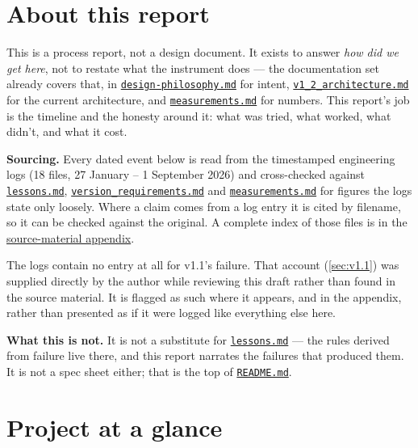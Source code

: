 \documentclass[11pt,a4paper]{article}
\newcommand{\doc}[1]{\href{https://github.com/Lambros25/Function-Generator/blob/main/docs/#1}{\texttt{#1}}}
\newcommand{\docu}[2]{\href{https://github.com/Lambros25/Function-Generator/blob/main/docs/#1}{\texttt{#2}}}
\newcommand{\repofile}[1]{\href{https://github.com/Lambros25/Function-Generator/blob/main/#1}{\texttt{#1}}}
\begin{document}
\section{About this report}
\label{sec:about}

This is a process report, not a design document. It exists to answer \emph{how did we get
    here}, not to restate what the instrument does --- the documentation set already covers
that, in \doc{design-philosophy.md} for intent, \docu{v1_2_architecture.md}{v1\_2\_architecture.md}
for the current architecture, and \doc{measurements.md} for numbers. This report's job is
the timeline and the honesty around it: what was tried, what worked, what didn't, and
what it cost.

\textbf{Sourcing.} Every dated event below is read from the timestamped engineering logs
(18 files, 27 January -- 1 September 2026) and cross-checked against \doc{lessons.md},
\docu{version_requirements.md}{version\_requirements.md} and \doc{measurements.md} for
figures the logs state only loosely. Where a claim comes from a log entry it is cited by
filename, so it can be checked against the original. A complete index of those files is in
the \hyperref[sec:appendix-sources]{source-material appendix}.

\begin{caveat}[title={One gap in the record}]
    The logs contain no entry at all for v1.1's failure. That account (\cref{sec:v1.1})
    was supplied directly by the author while reviewing this draft rather than found in
    the source material. It is flagged as such where it appears, and in the appendix,
    rather than presented as if it were logged like everything else here.
\end{caveat}

\textbf{What this is not.} It is not a substitute for \doc{lessons.md} --- the rules
derived from failure live there, and this report narrates the failures that produced
them. It is not a spec sheet either; that is the top of \repofile{README.md}.

\section{Project at a glance}
\label{sec:glance}
\end{document}
